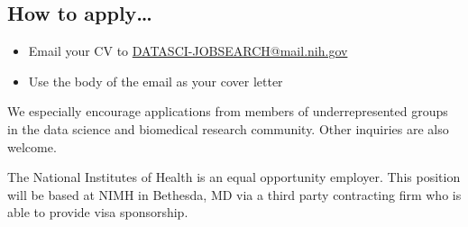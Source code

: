 \documentclass[11pt,letterpaper]{article}
\begin{document}
\begin{multicols}{2}
\section*{How to apply…}
\begin{itemize}[leftmargin=*, noitemsep, topsep=0pt]
    \item Email your CV to \href{mailto:DATASCI-JOBSEARCH@mail.nih.gov}{DATASCI-JOBSEARCH@mail.nih.gov}
    \item Use the body of the email as your cover letter
\end{itemize}

We especially encourage applications from members of underrepresented groups in the data science and biomedical research community. Other inquiries are also welcome.

The National Institutes of Health is an equal opportunity employer. This position will be based at NIMH in Bethesda, MD via a third party contracting firm who is able to provide visa sponsorship.
\end{multicols}
\end{document}
